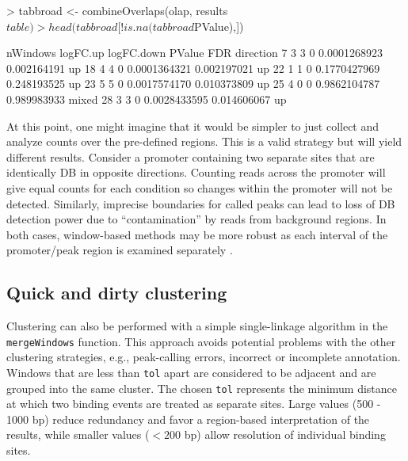 \documentclass[12pt]{report}
\renewenvironment{Schunk}{\vspace{0pt}}{\vspace{0pt}}
\newcommand{\code}[1]{{\small\texttt{#1}}}
\begin{document}
\begin{Schunk}
\begin{Sinput}
> tabbroad <- combineOverlaps(olap, results$table)
> head(tabbroad[!is.na(tabbroad$PValue),])
\end{Sinput}
\begin{Soutput}
   nWindows logFC.up logFC.down       PValue         FDR direction
7         3        3          0 0.0001268923 0.002164191        up
18        4        4          0 0.0001364321 0.002197021        up
22        1        1          0 0.1770427969 0.248193525        up
23        5        5          0 0.0017574170 0.010373809        up
25        4        0          0 0.9862104787 0.989983933     mixed
28        3        3          0 0.0028433595 0.014606067        up
\end{Soutput}
\end{Schunk}

At this point, one might imagine that it would be simpler to just collect and analyze counts over the pre-defined regions. 
This is a valid strategy but will yield different results. 
Consider a promoter containing two separate sites that are identically DB in opposite directions. 
Counting reads across the promoter will give equal counts for each condition so changes within the promoter will not be detected. 
Similarly, imprecise boundaries for called peaks can lead to loss of DB detection power due to ``contamination'' by reads from background regions. 
In both cases, window-based methods may be more robust as each interval of the promoter/peak region is examined separately \citep{lun2014}.

\subsection{Quick and dirty clustering}
\label{sec:cluster}
Clustering can also be performed with a simple single-linkage algorithm in the \code{mergeWindows} function.
This approach avoids potential problems with the other clustering strategies, e.g., peak-calling errors, incorrect or incomplete annotation. 
Windows that are less than \code{tol} apart are considered to be adjacent and are grouped into the same cluster.
The chosen \code{tol} represents the minimum distance at which two binding events are treated as separate sites.
Large values (500 - 1000 bp) reduce redundancy and favor a region-based interpretation of the results, while smaller values ($< 200$ bp) allow resolution of individual binding sites.
\end{document}
